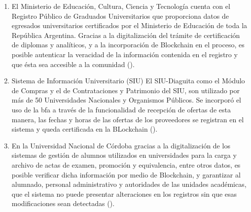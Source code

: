 \begin{enumerate}
  
  \item El Ministerio de Educación, Cultura, Ciencia y Tecnología cuenta con el Registro Público de Graduados Universitarios que proporciona datos de egresados universitarios certificados por el Ministerio de Educación de toda la República Argentina. Gracias a la digitalización del trámite de certificación de diplomas y analíticos, y a la incorporación de  Blockchain  en el proceso, es posible autenticar la veracidad de la información contenida en el registro y que ésta sea accesible a la comunidad (\cite[]{Blockchain_federal_argentina_aplicaciones_nodate}).
  
  \item  Sistema de Información Universitario (SIU) El SIU-Diaguita como el  Módulo de Compras y el de  Contrataciones y Patrimonio del SIU, son utilizado por más de 50 Universidades Nacionales y Organismos Públicos. Se incorporó el uso de  la \gls{bfa} a través  de la funcionalidad de recepción de ofertas de esta manera, las fechas y horas de las ofertas de los proveedores  se registran en el sistema y queda certificada en la BLockchain 
(\cite[]{Blockchain_federal_argentina_aplicaciones_nodate}).

\item En la Universidad Nacional de Córdoba gracias a la digitalización de los sistemas de gestión de alumnos utilizados en universidades para la carga y archivo de actas de examen, promoción y equivalencia, entre otros datos, es posible verificar dicha información por medio de  Blockchain, y garantizar al alumnado, personal administrativo y autoridades de las unidades académicas, que el sistema no puede presentar alteraciones en los registros sin que esas modificaciones sean detectadas (\cite[]{Blockchain_federal_argentina_aplicaciones_nodate}).


\end{enumerate}






